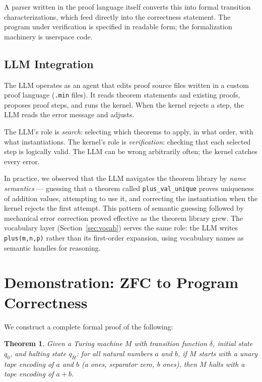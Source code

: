 \documentclass[letterpaper]{article}
\newtheorem{theorem}{Theorem}
\begin{document}
\noindent A parser written in the proof language itself converts this
into formal transition characterizations, which feed directly into the
correctness statement. The program under verification is specified in
readable form; the formalization machinery is userspace code.

\subsection{LLM Integration}

The LLM operates as an agent that edits proof source files written in a
custom proof language (\texttt{.min} files). It reads theorem statements and existing
proofs, proposes proof steps, and runs the kernel. When the kernel rejects
a step, the LLM reads the error message and adjusts.

The LLM's role is \emph{search}: selecting which theorems to apply, in what
order, with what instantiations. The kernel's role is \emph{verification}:
checking that each selected step is logically valid. The LLM can be wrong
arbitrarily often; the kernel catches every error.

In practice, we observed that the LLM navigates the theorem library by
\emph{name semantics} --- guessing that a theorem called
\texttt{plus\_val\_unique} proves uniqueness of addition values, attempting to
use it, and correcting the instantiation when the kernel rejects the first
attempt. This pattern of semantic guessing followed by mechanical error
correction proved effective as the theorem library grew. The vocabulary
layer (Section~\ref{sec:vocab}) serves the same role: the LLM writes
\texttt{plus(m,n,p)} rather than its first-order expansion, using
vocabulary names as semantic handles for reasoning.

\section{Demonstration: ZFC to Program Correctness}
\label{sec:demo}

We construct a complete formal proof of the following:

\begin{theorem}
Given a Turing machine $M$ with transition function $\delta$, initial state
$q_0$, and halting state $q_H$: for all natural numbers $a$ and $b$, if $M$
starts with a unary tape encoding of $a$ and $b$ (a ones, separator zero, b
ones), then $M$ halts with a tape encoding of $a + b$.
\end{theorem}
\end{document}
